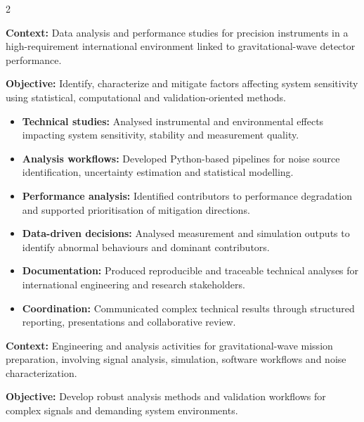 \documentclass[8pt,a4paper,ragged2e,withhyper]{altacv}
\begin{document}
\begin{paracol}{2}
\divider


\textbf{Context:} Data analysis and performance studies for precision instruments in a high-requirement international environment linked to gravitational-wave detector performance.

\textbf{Objective:} Identify, characterize and mitigate factors affecting system sensitivity using statistical, computational and validation-oriented methods.

\begin{itemize}
  \item \textbf{Technical studies:} Analysed instrumental and environmental effects impacting system sensitivity, stability and measurement quality.
  \item \textbf{Analysis workflows:} Developed Python-based pipelines for noise source identification, uncertainty estimation and statistical modelling.
  \item \textbf{Performance analysis:} Identified contributors to performance degradation and supported prioritisation of mitigation directions.
  \item \textbf{Data-driven decisions:} Analysed measurement and simulation outputs to identify abnormal behaviours and dominant contributors.
  \item \textbf{Documentation:} Produced reproducible and traceable technical analyses for international engineering and research stakeholders.
  \item \textbf{Coordination:} Communicated complex technical results through structured reporting, presentations and collaborative review.
\end{itemize}

\divider


\textbf{Context:} Engineering and analysis activities for gravitational-wave mission preparation, involving signal analysis, simulation, software workflows and noise characterization.

\textbf{Objective:} Develop robust analysis methods and validation workflows for complex signals and demanding system environments.


\end{paracol}
\end{document}
